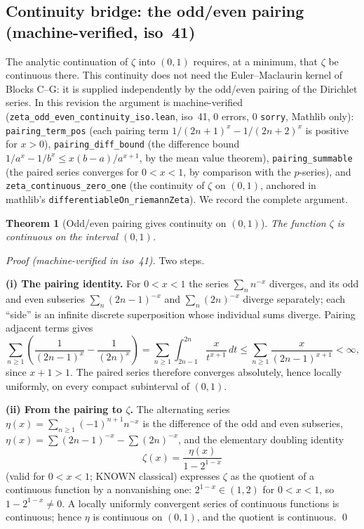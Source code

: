 \documentclass{article}
\newtheorem{theorem}{Theorem}[section]
\newcommand{\zt}{\zeta}
\begin{document}
\subsection{Continuity bridge: the odd/even pairing (machine-verified, iso~41)}
\label{sec:contbridge}

The analytic continuation of $\zt$ into $(0,1)$ requires, at a minimum, that
$\zt$ be continuous there. This continuity does not need the
Euler--Maclaurin kernel of Blocks C--G: it is supplied independently by the
odd/even pairing of the Dirichlet series. In this revision the argument is
machine-verified (\texttt{zeta\_odd\_even\_continuity\_iso.lean}, iso~41,
0 errors, 0 \texttt{sorry}, Mathlib only): \texttt{pairing\_term\_pos}
(each pairing term $1/(2n+1)^x-1/(2n+2)^x$ is positive for $x>0$),
\texttt{pairing\_diff\_bound} (the difference bound
$1/a^x-1/b^x\le x(b-a)/a^{x+1}$, by the mean value theorem),
\texttt{pairing\_summable} (the paired series converges for $0<x<1$, by
comparison with the $p$-series), and \texttt{zeta\_continuous\_zero\_one}
(the continuity of $\zt$ on $(0,1)$, anchored in mathlib's
\texttt{differentiableOn\_riemannZeta}). We record the complete argument.

\begin{theorem}[Odd/even pairing gives continuity on $(0,1)$]
\label{thm:contbridge}
The function $\zt$ is continuous on the interval $(0,1)$.
\end{theorem}

\emph{Proof (machine-verified in iso~41).}
Two steps.

\textbf{(i) The pairing identity.} For $0<x<1$ the series $\sum_n n^{-x}$
diverges, and its odd and even subseries $\sum_n(2n-1)^{-x}$ and
$\sum_n(2n)^{-x}$ diverge separately; each ``side'' is an infinite discrete
superposition whose individual sums diverge. Pairing adjacent terms gives
\[
\sum_{n\ge1}\left(\frac1{(2n-1)^x}-\frac1{(2n)^x}\right)
=\sum_{n\ge1}\int_{2n-1}^{2n}\frac{x}{t^{x+1}}\,dt
\le\sum_{n\ge1}\frac{x}{(2n-1)^{x+1}}<\infty,
\]
since $x+1>1$. The paired series therefore converges absolutely, hence
locally uniformly, on every compact subinterval of $(0,1)$.

\textbf{(ii) From the pairing to $\zt$.} The alternating series
$\eta(x)=\sum_{n\ge1}(-1)^{n+1}n^{-x}$ is the difference of the odd and
even subseries, $\eta(x)=\sum(2n-1)^{-x}-\sum(2n)^{-x}$, and the elementary
doubling identity
\[
\zt(x)=\frac{\eta(x)}{1-2^{1-x}}
\]
(valid for $0<x<1$; KNOWN classical) expresses $\zt$ as the quotient of a
continuous function by a nonvanishing one: $2^{1-x}\in(1,2)$ for
$0<x<1$, so $1-2^{1-x}\neq0$. A locally uniformly convergent series of
continuous functions is continuous; hence $\eta$ is continuous on $(0,1)$,
and the quotient is continuous. \qed
\end{document}
